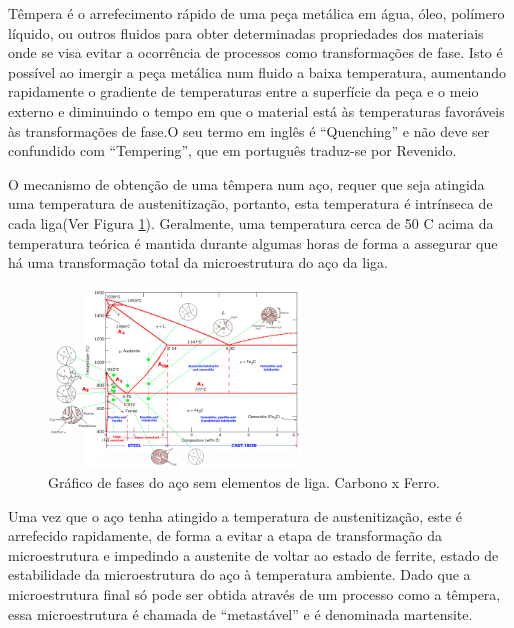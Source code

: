 Têmpera é o arrefecimento rápido de uma peça metálica em água, óleo, polímero líquido, ou outros fluidos para obter determinadas propriedades dos materiais onde se visa evitar a ocorrência de processos como transformações de fase. Isto é possível ao imergir a peça metálica num fluido a baixa temperatura, aumentando rapidamente o gradiente de temperaturas entre a superfície da peça e o meio externo e diminuindo o tempo em que o material está às temperaturas favoráveis às transformações de fase\cite{Chaus2006}.O seu termo em inglês é “Quenching” e não deve ser confundido com “Tempering”, que em português traduz-se por Revenido.
\par
O mecanismo de obtenção de uma têmpera num aço, requer que seja atingida uma temperatura de austenitização, portanto, esta temperatura é intrínseca de cada liga(Ver Figura \ref{fig:Iron_Carbon_Diagram}). Geralmente, uma temperatura cerca de 50 \textdegree C acima da temperatura teórica é mantida durante algumas horas de forma a assegurar que há uma transformação total da microestrutura do aço da liga.
\begin{figure}[htb]
    \centering
    \includegraphics[width = 0.6\textwidth]{Figures/Cap2/Iron_Carbon_Diagram.png}
    \caption[Gráfico de fases do aço. Carbono x Ferro]%
    {Gráfico de fases do aço sem elementos de liga. Carbono x Ferro\cite{FollSD}. }
    \label{fig:Iron_Carbon_Diagram}
\end{figure}
\par
Uma vez que o aço tenha atingido a temperatura de austenitização, este é arrefecido rapidamente, de forma a evitar a etapa de transformação da microestrutura e impedindo a austenite de voltar ao estado de ferrite, estado de estabilidade da microestrutura do aço à temperatura ambiente. Dado que a microestrutura final só pode ser obtida através de um processo como a têmpera, essa microestrutura é chamada de “metastável” e é denominada martensite.
